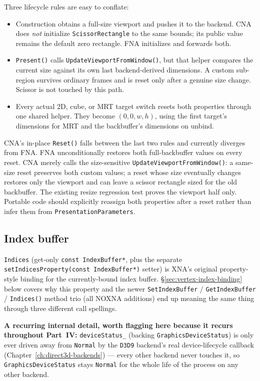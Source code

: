 Three lifecycle rules are easy to conflate:

\begin{itemize}
  \item Construction obtains a full-size viewport and pushes it to the backend. CNA does
        \emph{not} initialize \texttt{ScissorRectangle} to the same bounds; its public value
        remains the default zero rectangle. FNA initializes and forwards both.
  \item \texttt{Present()} calls \texttt{UpdateViewportFromWindow()}, but that helper compares
        the current size against its own last backend-derived dimensions. A custom sub-region
        survives ordinary frames and is reset only after a genuine size change. Scissor is not
        touched by this path.
  \item Every actual 2D, cube, or MRT target switch resets both properties through one shared
        helper. They become
        \((0,0,w,h)\), using the first target's dimensions for MRT and the backbuffer's
        dimensions on unbind.
\end{itemize}

CNA's in-place \texttt{Reset()} falls between the last two rules and currently diverges from
FNA. FNA unconditionally restores both full-backbuffer values on every reset. CNA merely calls
the size-sensitive \texttt{UpdateViewportFromWindow()}: a same-size reset preserves both custom
values; a reset whose size eventually changes restores only the viewport and can leave a
scissor rectangle sized for the old backbuffer. The existing resize regression test proves the
viewport half only. Portable code should explicitly reassign both properties after a reset
rather than infer them from \texttt{PresentationParameters}.

\subsection{Index buffer}

\texttt{Indices} (get-only \texttt{const IndexBuffer*}, plus the separate
\texttt{setIndicesProperty(const IndexBuffer*)} setter) is XNA's original property-style
binding for the currently-bound index buffer. \S\ref{sec:vertex-index-binding} below covers why
this property and the newer \texttt{SetIndexBuffer} / \texttt{GetIndexBuffer} / \texttt{Indices()}
method trio (all NOXNA additions) end up meaning the same thing through three different
call spellings.

\begin{sourcenote}
\textbf{A recurring internal detail, worth flagging here because it recurs throughout
Part~IV:} \texttt{deviceStatus\_} (backing \texttt{GraphicsDeviceStatus}) is only ever driven
away from \texttt{Normal} by the \texttt{D3D9} backend's real device-lifecycle callback
(Chapter~\ref{ch:direct3d-backends}) --- every other backend never touches it, so
\texttt{GraphicsDeviceStatus} stays \texttt{Normal} for the whole life of the process on any
other backend.
\end{sourcenote}


